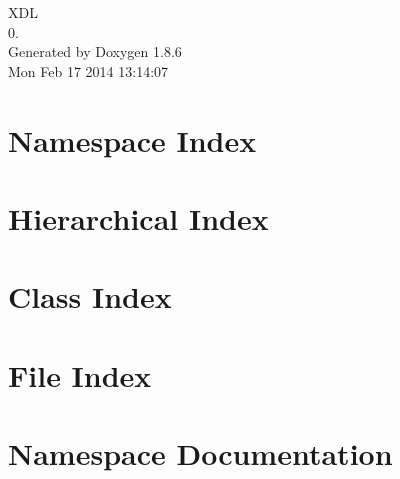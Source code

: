 \documentclass[twoside]{book}
\newcommand{\clearemptydoublepage}{%
  \newpage{\pagestyle{empty}\cleardoublepage}%
}
\begin{document}
\hypersetup{pageanchor=false}
\begin{titlepage}
\vspace*{7cm}
\begin{center}%
{\Large X\-D\-L \\[1ex]\large 0. }\\
\vspace*{1cm}
{\large Generated by Doxygen 1.8.6}\\
\vspace*{0.5cm}
{\small Mon Feb 17 2014 13:14:07}\\
\end{center}
\end{titlepage}
\clearemptydoublepage
\tableofcontents
\clearemptydoublepage
{}
\hypersetup{pageanchor=true}

\chapter{Namespace Index}

\chapter{Hierarchical Index}

\chapter{Class Index}

\chapter{File Index}

\chapter{Namespace Documentation}

\end{document}
